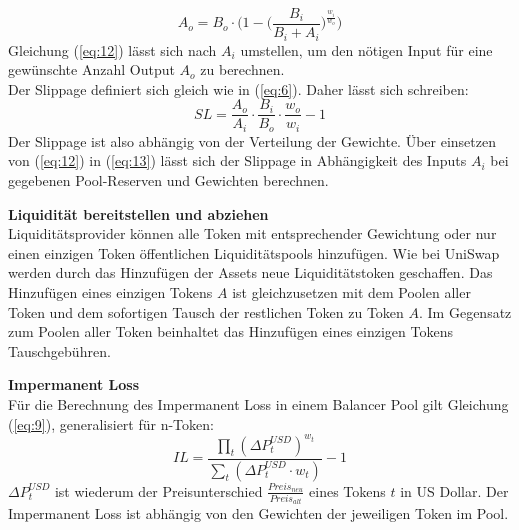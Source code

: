 \documentclass[12pt,a4paper,titlepage,oneside,english]{article}
\begin{document}
\begin{equation}
A_{o} = B_{o} \cdot \Biggl(1-\biggl(\dfrac{B_{i}}{B_{i}+ A_{i}}\biggr)^{\tfrac{w_{i}}{w_{o}}}\Biggr) \label{eq:12} 
\end{equation}
Gleichung (\ref{eq:12}) lässt sich nach $A_{i}$ umstellen, um den nötigen Input für eine gewünschte Anzahl Output $A_{o}$ zu berechnen.\\
Der Slippage definiert sich gleich wie in (\ref{eq:6}). Daher lässt sich schreiben: 
\begin{equation}
SL= \dfrac{A_{o}}{A_{i}} \cdot \dfrac{B_{i}}{B_{o}} \cdot \dfrac{w_{o}}{w_{i}} -1 \label{eq:13}
\end{equation}
Der Slippage ist also abhängig von der Verteilung der Gewichte. Über einsetzen von (\ref{eq:12}) in (\ref{eq:13}) lässt sich der Slippage in Abhängigkeit des Inputs $A_{i}$ bei gegebenen Pool-Reserven und Gewichten berechnen. 

\textbf{Liquidität bereitstellen und abziehen} \\
Liquiditätsprovider können alle Token mit entsprechender Gewichtung oder nur einen einzigen Token öffentlichen Liquiditätspools hinzufügen. Wie bei UniSwap werden durch das Hinzufügen der Assets neue Liquiditätstoken geschaffen. Das Hinzufügen eines einzigen Tokens $A$ ist gleichzusetzen mit dem Poolen aller Token und dem sofortigen Tausch der restlichen Token zu Token $A$. Im Gegensatz zum Poolen aller Token beinhaltet das Hinzufügen eines einzigen Tokens Tauschgebühren. \citep{MartinelliMushegian2019}

\textbf{Impermanent Loss} \\
Für die Berechnung des Impermanent Loss in einem Balancer Pool gilt Gleichung (\ref{eq:9}), generalisiert für n-Token: \citep{Martinelli2020}
\begin{equation}
IL = \dfrac{\prod_{t}(\Delta P^{USD}_{t})^{w_{t}}}{\sum_{t}(\Delta P^{USD}_{t} \cdot w_{t})}-1 \label{eq:14}
\end{equation}
$\Delta P^{USD}_{t}$ ist wiederum der Preisunterschied $\tfrac{Preis_{neu}}{Preis_{alt}}$ eines Tokens $t$ in US Dollar. %
Der Impermanent Loss ist abhängig von den Gewichten der jeweiligen Token im Pool. %
\end{document}
